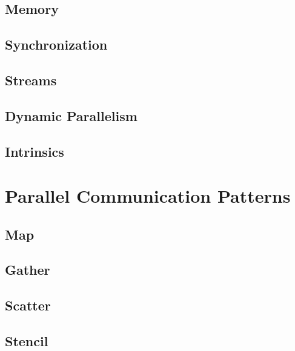 \documentclass[12px,oz]{report}
\begin{document}
	\section{Memory}
	\label{sec-pm-memory}
	
	
	\section{Synchronization}
	\label{sec-pm-synch}
	
	
	\section{Streams}
	\label{sec-pm-streams}
		
	
	\section{Dynamic Parallelism}
	\label{sec-pm-dynamic}
	
	
	\section{Intrinsics}
	\label{sec-pm-intrinsics}
	


\chapter{Parallel Communication Patterns}
\label{ch-patterns}

	
	\section{Map}
	\label{sec-map}
	
	
	\section{Gather}
	\label{sec-gather}
	
	
	\section{Scatter}
	\label{sec-scatter}
	
	
	\section{Stencil}
	\label{sec-stencil}
	
	
\end{document}

